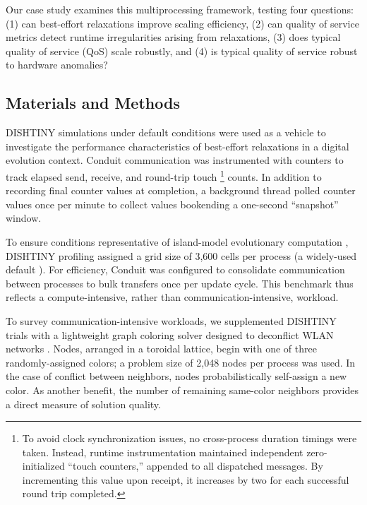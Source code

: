Our case study examines this multiprocessing framework, testing four questions: (1) can best-effort relaxations improve scaling efficiency, (2) can quality of service metrics detect runtime irregularities arising from relaxations, (3) does typical quality of service (QoS) scale robustly, and (4) is typical quality of service robust to hardware anomalies?

\subsection{Materials and Methods}
\label{moreno:sec:case1:design}

DISHTINY simulations under default conditions were used as a vehicle to investigate the performance characteristics of best-effort relaxations in a digital evolution context.
Conduit communication was instrumented with counters to track elapsed send, receive, and round-trip touch
\unskip\footnote{%
To avoid clock synchronization issues, no cross-process duration timings were taken.
Instead, runtime instrumentation maintained independent zero-initialized ``touch counters,'' appended to all dispatched messages.
By incrementing this value upon receipt, it increases by two for each successful round trip completed.
}
counts.
In addition to recording final counter values at completion, a background thread polled counter values once per minute to collect values bookending a one-second ``snapshot'' window.

To ensure conditions representative of island-model evolutionary computation \cite{bennett1999building}, DISHTINY profiling assigned a grid size of 3{\small,}600 cells per process (a widely-used default \cite{ofria2004avida}).
For efficiency, Conduit was configured to consolidate communication between processes to bulk transfers once per update cycle.
This benchmark thus reflects a compute-intensive, rather than communication-intensive, workload.

To survey communication-intensive workloads, we supplemented DISHTINY trials with a lightweight graph coloring solver designed to deconflict WLAN networks \cite{leith2012wlan}.
Nodes, arranged in a toroidal lattice, begin with one of three randomly-assigned colors; a problem size of 2{\small,}048 nodes per process was used.
In the case of conflict between neighbors, nodes probabilistically self-assign a new color.
As another benefit, the number of remaining same-color neighbors provides a direct measure of solution quality.


